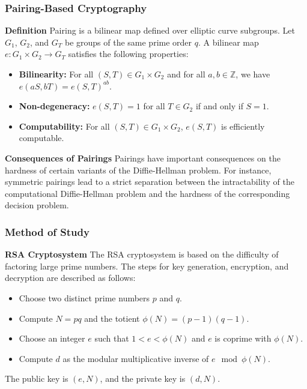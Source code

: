 \documentclass{beamer}
\begin{document}
\begin{frame}
\frametitle{Pairing-Based Cryptography}

\textbf{Definition}
Pairing is a bilinear map defined over elliptic curve subgroups. Let \( G_1 \), \( G_2 \), and \( G_T \) be groups of the same prime order \( q \). A bilinear map \( e: G_1 \times G_2 \to G_T \) satisfies the following properties:
\begin{itemize}
    \item \textbf{Bilinearity:} For all \( (S, T) \in G_1 \times G_2 \) and for all \( a, b \in \mathbb{Z} \), we have \( e(aS, bT) = e(S, T)^{ab} \).
    \item \textbf{Non-degeneracy:} \( e(S, T) = 1 \) for all \( T \in G_2 \) if and only if \( S = 1 \).
    \item \textbf{Computability:} For all \( (S, T) \in G_1 \times G_2 \), \( e(S, T) \) is efficiently computable.
\end{itemize}
\end{frame}

\begin{frame}
\textbf{Consequences of Pairings}
Pairings have important consequences on the hardness of certain variants of the Diffie-Hellman problem. For instance, symmetric pairings lead to a strict separation between the intractability of the computational Diffie-Hellman problem and the hardness of the corresponding decision problem.
\end{frame}

\begin{frame}
\frametitle{Method of Study}

\textbf{RSA Cryptosystem}
The RSA cryptosystem is based on the difficulty of factoring large prime numbers. The steps for key generation, encryption, and decryption are described as follows:
\begin{itemize}
    \item Choose two distinct prime numbers \( p \) and \( q \).
    \item Compute \( N = pq \) and the totient \( \phi(N) = (p-1)(q-1) \).
    \item Choose an integer \( e \) such that \( 1 < e < \phi(N) \) and \( e \) is coprime with \( \phi(N) \).
    \item Compute \( d \) as the modular multiplicative inverse of \( e \mod \phi(N) \).
\end{itemize}
The public key is \( (e, N) \), and the private key is \( (d, N) \).
\end{frame}
\end{document}
